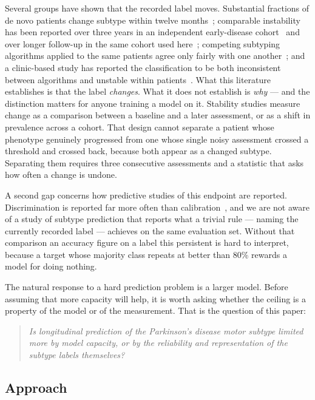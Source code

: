 \documentclass[11pt]{article}
\begin{document}
Several groups have shown that the recorded label moves. Substantial fractions
of de novo patients change subtype within twelve months~\citep{simuni2016};
comparable instability has been reported over three years in an independent
early-disease cohort~\citep{kohat2021} and over longer follow-up in the same
cohort used here~\citep{lee2019}; competing subtyping algorithms applied to the
same patients agree only fairly with one another~\citep{ren2020,ren2021}; and a
clinic-based study has reported the classification to be both inconsistent
between algorithms and unstable within patients~\citep{voncoelln2021,erro2019}.
What this literature establishes is that the label \emph{changes}. What it does
not establish is \emph{why} --- and the distinction matters for anyone training a
model on it. Stability studies measure change as a comparison between a baseline
and a later assessment, or as a shift in prevalence across a cohort. That design
cannot separate a patient whose phenotype genuinely progressed from one whose
single noisy assessment crossed a threshold and crossed back, because both appear
as a changed subtype. Separating them requires three consecutive assessments and
a statistic that asks how often a change is undone.

A second gap concerns how predictive studies of this endpoint are reported.
Discrimination is reported far more often than
calibration~\citep{vancalster2019,bouwmeester2012}, and we are not aware of a
study of subtype prediction that reports what a trivial rule --- naming the
currently recorded label --- achieves on the same evaluation set. Without that
comparison an accuracy figure on a label this persistent is hard to interpret,
because a target whose majority class repeats at better than 80\% rewards a model
for doing nothing.

The natural response to a hard prediction problem is a larger model. Before
assuming that more capacity will help, it is worth asking whether the ceiling is
a property of the model or of the measurement. That is the question of this
paper:

\begin{quote}
\emph{Is longitudinal prediction of the Parkinson's disease motor subtype
limited more by model capacity, or by the reliability and representation of the
subtype labels themselves?}
\end{quote}

\subsection{Approach}
\end{document}
